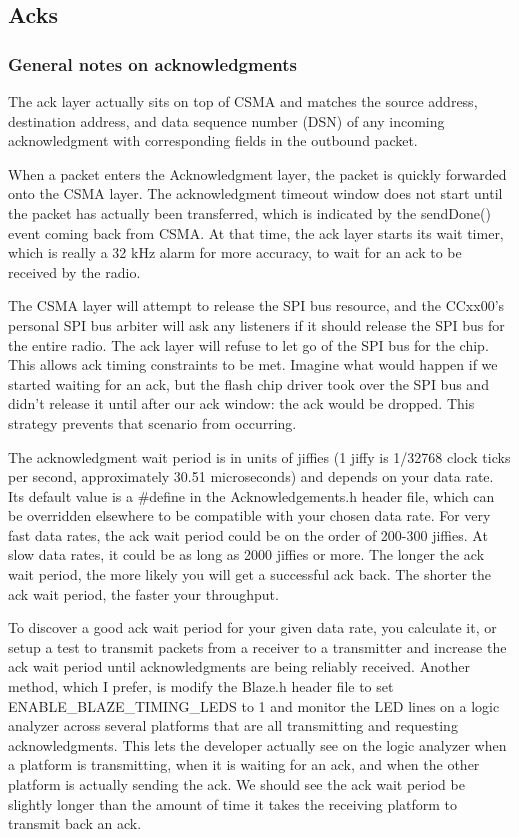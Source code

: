\documentclass{article}
\begin{document}
\subsection{Acks}
\label{sec:acks}
\subsubsection{General notes on acknowledgments}
The ack layer actually sits on top of CSMA and matches the source address,
destination address, and data sequence number (DSN) of any incoming acknowledgment
with corresponding fields in the outbound packet.

When a packet enters the Acknowledgment layer, the packet is quickly forwarded
onto the CSMA layer. The acknowledgment timeout window does not start until the 
packet has actually been transferred, which is indicated by the sendDone() event
coming back from CSMA.  At that time, the ack layer starts its wait timer, which 
is really a 32 kHz alarm for more accuracy, to wait for an ack to be received by the radio.

The CSMA layer will attempt to release the SPI bus resource, and the CCxx00's personal SPI
bus arbiter will ask any listeners if it should release the SPI bus for the entire radio.
The ack layer will refuse to let go of the SPI bus for the chip.  This allows ack timing constraints
to be met. Imagine what would happen if we started waiting for an ack, but the flash chip driver
took over the SPI bus and didn't release it until after our ack window: the ack would be dropped.
This strategy prevents that scenario from occurring. 

The acknowledgment wait period is in units of jiffies (1 jiffy is 1/32768 clock ticks
per second, approximately 30.51 microseconds) and depends on your data rate.  
Its default value is a \#define in the Acknowledgements.h
header file, which can be overridden elsewhere to be compatible with your chosen data rate. 
For very fast data rates, the ack wait period could be on the order of 200-300 jiffies.  At slow
data rates, it could be as long as 2000 jiffies or more.  The longer the ack wait period, the more
likely you will get a successful ack back.  The shorter the ack wait period, the faster your
throughput.

To discover a good ack wait period for your given data rate, you calculate it, or setup a test to transmit
packets from a receiver to a transmitter and increase the ack wait period until acknowledgments
are being reliably received.  Another method, which I prefer, is modify the Blaze.h
header file to set ENABLE\_BLAZE\_TIMING\_LEDS to 1 and monitor the LED lines on a logic analyzer
across several platforms that are all transmitting and requesting acknowledgments. This lets the
developer actually see on the logic analyzer when a platform is transmitting, when it is waiting
for an ack, and when the other platform is actually sending the ack. We should see the ack wait
period be slightly longer than the amount of time it takes the receiving platform to transmit
back an ack.
\end{document}

